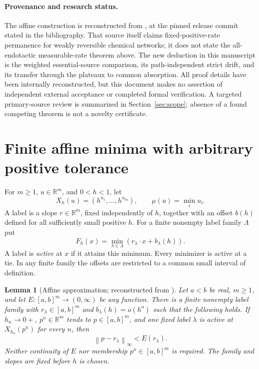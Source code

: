 \documentclass[11pt]{article}
\newtheorem{lemma}[theorem]{Lemma}
\theoremstyle{definition}
\theoremstyle{remark}
\newcommand{\R}{\mathbb R}
\newcommand{\norm}[1]{\left\|#1\right\|}
\numberwithin{equation}{section}
\begin{document}
\paragraph{Provenance and research status.}
The affine construction is reconstructed from
\cite[Lemma 2.1 and Corollary 2.2]{OAI149}, at the pinned release
commit stated in the bibliography. That source itself claims
fixed-positive-rate permanence for weakly reversible chemical
networks; it does not state the all-endotactic measurable-rate
theorem above. The new deduction in this manuscript is the weighted
essential-source comparison, its path-independent strict drift,
and its transfer through the plateaux to common absorption.
All proof details have been internally reconstructed, but this
document makes no assertion of independent external acceptance or
completed formal verification. A targeted primary-source review is
summarized in Section~\ref{sec:scope}; absence of a found competing
theorem is not a novelty certificate.

\section{Finite affine minima with arbitrary positive tolerance}
\label{sec:affine}

For $m\geq1$, $u\in\R^m$, and $0<h<1$, let
\[
 X_h(u)=(h^{u_1},\ldots,h^{u_m}),\qquad
 \mu(u)=\min_i u_i.
\]
A label is a slope $r\in\R^m$, fixed independently of $h$, together
with an offset $b(h)$ defined for all sufficiently small positive
$h$. For a finite nonempty label family $\Lambda$ put
\[
 F_h(x)=\min_{\lambda\in\Lambda}
          (r_\lambda\cdot x+b_\lambda(h)).
\]
A label is \emph{active} at $x$ if it attains this minimum. Every
minimizer is active at a tie. In any finite family the offsets are
restricted to a common small interval of definition.

\begin{lemma}[Affine approximation; reconstructed from \cite{OAI149}]
\label{lem:affine}
Let $a<b$ be real, $m\geq1$, and let
$E:[a,b]^m\to(0,\infty)$ be any function. There is a finite
nonempty label family with $r_\lambda\in[a,b]^m$ and
$b_\lambda(h)=o(h^a)$ such that the following holds. If
$h_n\to0+$, $p^n\in\R^m$ tends to $p\in[a,b]^m$, and one fixed
label $\lambda$ is active at $X_{h_n}(p^n)$ for every $n$, then
\[
 \norm{p-r_\lambda}_\infty<E(r_\lambda).
\]
Neither continuity of $E$ nor membership $p^n\in[a,b]^m$ is
required. The family and slopes are fixed before $h$ is chosen.
\end{lemma}
\end{document}
